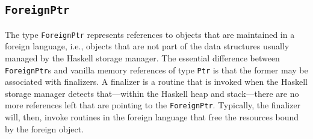 \documentclass[a4paper,twoside]{article}
\newcommand{\code}[1]{\texttt{#1}}      %
\begin{document}
\subsection{\code{ForeignPtr}}
\label{sec:ForeignPtr}

The type \code{ForeignPtr} represents references to objects that are
maintained in a foreign language, i.e., objects that are not part of the data
structures usually managed by the Haskell storage manager. The essential
difference between \code{ForeignPtr}s and vanilla memory references of type
\code{Ptr} is that the former may be associated with finalizers.  A finalizer
is a routine that is invoked when the Haskell storage manager detects
that---within the Haskell heap and stack---there are no more references left
that are pointing to the \code{ForeignPtr}.  Typically, the finalizer will,
then, invoke routines in the foreign language that free the resources bound by
the foreign object.  
\end{document}
